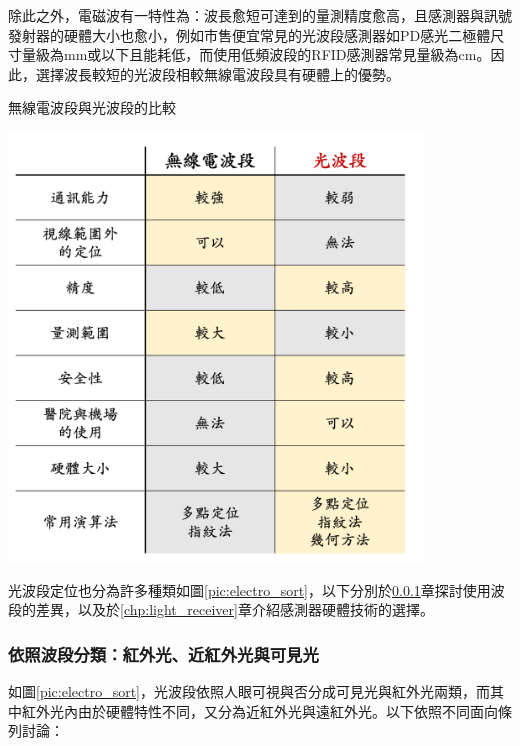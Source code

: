            除此之外，電磁波有一特性為：波長愈短可達到的量測精度愈高，且感測器與訊號發射器的硬體大小也愈小，例如市售便宜常見的光波段感測器如PD感光二極體尺寸量級為mm或以下\cite{datasheet:led_sfh4545}且能耗低，而使用低頻波段的RFID感測器常見量級為cm\cite{datasheet:rfid_tag}。因此，選擇波長較短的光波段相較無線電波段具有硬體上的優勢。

            \begin{table}[htpb]
                \centering
                \caption{無線電波段與光波段的比較}
                \label{pic:method_compare}
                \includegraphics[width=11cm]{ch2pic/method_compare.png}   
            \end{table}


            光波段定位也分為許多種類如圖\ref{pic:electro_sort}，以下分別於\ref{chp:light_electro}章探討使用波段的差異，以及於\ref{chp:light_receiver}章介紹感測器硬體技術的選擇。


            \subsubsection{依照波段分類：紅外光、近紅外光與可見光}

            \label{chp:light_electro}

            如圖\ref{pic:electro_sort}，光波段依照人眼可視與否分成可見光與紅外光兩類，而其中紅外光內由於硬體特性不同，又分為近紅外光與遠紅外光。以下依照不同面向條列討論：

